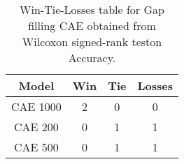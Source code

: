 \begin{table}[H]
\centering
\begin{tabular}{|c|c|c|c|}

\textbf{Model} &  \textbf{Win} &  \textbf{Tie} &  \textbf{Losses} \\
\hline

      CAE 1000 &             2 &             0 &                0 \\
\hline
       CAE 200 &             0 &             1 &                1 \\
\hline
       CAE 500 &             0 &             1 &                1 \\
\hline

\end{tabular}
\caption{Win-Tie-Losses table for Gap filling CAE obtained from Wilcoxon signed-rank teston Accuracy.}
\label{tab:gap_filling_cae_model_comparison}
\end{table}